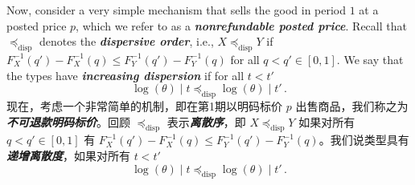 \documentclass[12pt,letterpaper]{article}
\newenvironment{original}{\color{black}\noindent}{}
\newenvironment{translation}{\color{blue}\noindent}{}
\theoremstyle{plain}
\theoremstyle{definition}
\theoremstyle{remark}
\renewcommand{\1}{\mathds{1}}
\theoremstyle{definition}
\begin{document}
\begin{original}
Now, consider a very simple mechanism that sells the good in period $1$ at a posted price $p$, which we refer to as a \textit{\textbf{nonrefundable posted price}}. Recall that $\preceq_{\text{disp}}$ denotes the \textit{\textbf{dispersive order}}, i.e., $X \preceq_{\text{disp}} Y$ if $F^{-1}_X(q') - F^{-1}_X(q) \leq F^{-1}_Y(q') - F^{-1}_Y(q)$ for all $q < q' \in [0, 1]$. We say that the types have \textit{\textbf{increasing dispersion}} if for all $t < t'$
\[\log(\theta) \mid t \preceq_{\text{disp}} \log(\theta) \mid t' \,.\]
\end{original}
\begin{translation}
现在，考虑一个非常简单的机制，即在第1期以明码标价 $p$ 出售商品，我们称之为\textit{\textbf{不可退款明码标价}}。回顾 $\preceq_{\text{disp}}$ 表示\textit{\textbf{离散序}}，即 $X \preceq_{\text{disp}} Y$ 如果对所有 $q < q' \in [0, 1]$ 有 $F^{-1}_X(q') - F^{-1}_X(q) \leq F^{-1}_Y(q') - F^{-1}_Y(q)$。我们说类型具有\textit{\textbf{递增离散度}}，如果对所有 $t < t'$
\[\log(\theta) \mid t \preceq_{\text{disp}} \log(\theta) \mid t' \,.\]
\end{translation}
\end{document}
